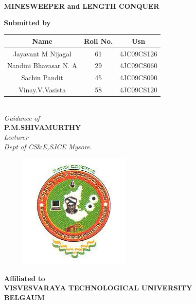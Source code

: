 \documentclass{article}
\begin{document}
\begin{center}
\textbf{MINESWEEPER and LENGTH CONQUER\\}
\end{center}
\begin{center}
\textbf{Submitted by}\\



\begin{tabular}{|c|c|c|}
\hline
Name&Roll No.&Usn\\
\hline
Jayavant M Nijagal&61&4JC09CS126\\
\hline
Nandini Bhavasar N. A &29&4JC09CS060\\
\hline
Sachin Pandit& 45 &4JC09CS090\\
\hline
Vinay.V.Vasista &58&4JC09CS120\\
\hline
\end{tabular}
\end{center}
\vspace*{1cm}
\begin{center}
\emph{\\Guidance of}\\
\textbf{P.M.SHIVAMURTHY}\\
\textit{Lecturer}\\
\textit{Dept of CS$\&$E,SJCE Mysore.}\\
\begin{figure}[htb]
\begin{center}
\ifpdf
\includegraphics[scale=0.30]{vtu.png}
\else
\fi
\end{center}
\end{figure}
\textbf{Affiliated to}\\
\textbf{VISVESVARAYA TECHNOLOGICAL UNIVERSITY}\\
\textbf{BELGAUM}
\end{center}

\newpage
\tableofcontents
\end{document}
